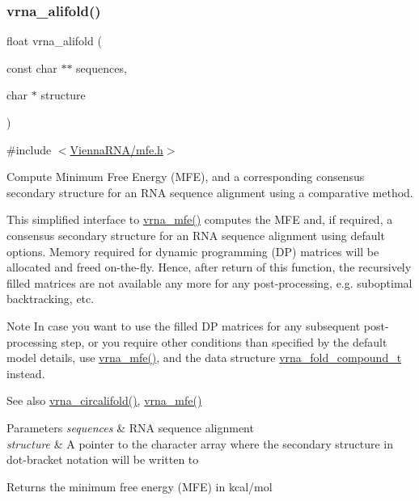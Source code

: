 \subsubsection{\texorpdfstring{vrna\_alifold()}{vrna\_alifold()}}
{\footnotesize\ttfamily float vrna\+\_\+alifold (\begin{DoxyParamCaption}\item[{const char $\ast$$\ast$}]{sequences,  }\item[{char $\ast$}]{structure }\end{DoxyParamCaption})}



{\ttfamily \#include $<$\mbox{\hyperlink{mfe_8h}{Vienna\+R\+N\+A/mfe.\+h}}$>$}



Compute Minimum Free Energy (M\+FE), and a corresponding consensus secondary structure for an R\+NA sequence alignment using a comparative method. 

This simplified interface to \mbox{\hyperlink{group__mfe__global_gabd3b147371ccf25c577f88bbbaf159fd}{vrna\+\_\+mfe()}} computes the M\+FE and, if required, a consensus secondary structure for an R\+NA sequence alignment using default options. Memory required for dynamic programming (DP) matrices will be allocated and free\textquotesingle{}d on-\/the-\/fly. Hence, after return of this function, the recursively filled matrices are not available any more for any post-\/processing, e.\+g. suboptimal backtracking, etc.

\begin{DoxyNote}{Note}
In case you want to use the filled DP matrices for any subsequent post-\/processing step, or you require other conditions than specified by the default model details, use \mbox{\hyperlink{group__mfe__global_gabd3b147371ccf25c577f88bbbaf159fd}{vrna\+\_\+mfe()}}, and the data structure \mbox{\hyperlink{group__fold__compound_ga1b0cef17fd40466cef5968eaeeff6166}{vrna\+\_\+fold\+\_\+compound\+\_\+t}} instead.
\end{DoxyNote}
\begin{DoxySeeAlso}{See also}
\mbox{\hyperlink{group__mfe__global_ga17a1be7490468c29c335ba9bffacba53}{vrna\+\_\+circalifold()}}, \mbox{\hyperlink{group__mfe__global_gabd3b147371ccf25c577f88bbbaf159fd}{vrna\+\_\+mfe()}}
\end{DoxySeeAlso}

\begin{DoxyParams}{Parameters}
{\em sequences} & R\+NA sequence alignment \\
\hline
{\em structure} & A pointer to the character array where the secondary structure in dot-\/bracket notation will be written to \\
\hline
\end{DoxyParams}
\begin{DoxyReturn}{Returns}
the minimum free energy (M\+FE) in kcal/mol 
\end{DoxyReturn}
\mbox{\label{group__mfe__global_ga17a1be7490468c29c335ba9bffacba53}} 
